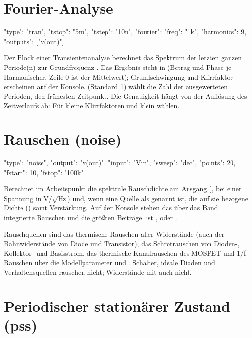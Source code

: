 \section{Fourier-Analyse}
\label{sec:fourier}

\begin{json}
{ "type": "tran", "tstop": "5m", "tstep": "10u",
  "fourier": { "freq": "1k", "harmonics": 9, "outputs": ["v(out)"] } }
\end{json}

Der Block  einer Transientenanalyse berechnet das Spektrum
der letzten ganzen Periode(n) zur Grundfrequenz . Das Ergebnis
steht in  (Betrag und Phase je Harmonischer,
Zeile 0 ist der Mittelwert); Grundschwingung und Klirrfaktor erscheinen auf
der Konsole.  (Standard 1) wählt die Zahl der ausgewerteten
Perioden,  den frühesten Zeitpunkt. Die Genauigkeit hängt von der
Auflösung des Zeitverlaufs ab: Für kleine Klirrfaktoren  und
 klein wählen.

\section{Rauschen (noise)}

\begin{json}
{ "type": "noise", "output": "v(out)", "input": "Vin",
  "sweep": "dec", "points": 20, "fstart": 10, "fstop": "100k" }
\end{json}

Berechnet im Arbeitspunkt die spektrale Rauschdichte am Ausgang
(, bei einer Spannung in V/$\sqrt{\text{Hz}}$) und, wenn eine
Quelle als  genannt ist, die auf sie bezogene Dichte
() samt Verstärkung. Auf der Konsole stehen das über das Band
integrierte Rauschen und die größten Beiträge.  ist
,  oder .

Rauschquellen sind das thermische Rauschen aller Widerstände (auch der
Bahnwiderstände von Diode und Transistor), das Schrotrauschen von
Dioden-, Kollektor- und Basisstrom, das thermische Kanalrauschen des MOSFET
und 1/f-Rauschen über die Modellparameter  und .
Schalter, ideale Dioden und Verhaltensquellen rauschen nicht; Widerstände
mit  auch nicht.

\section{Periodischer stationärer Zustand (pss)}

